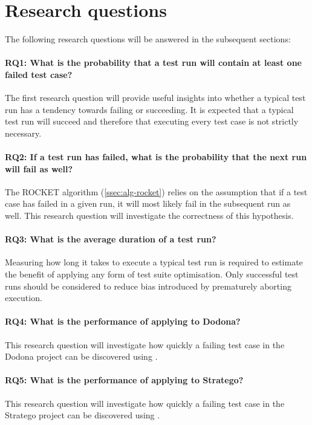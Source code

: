 
\section{Research questions}
The following research questions will be answered in the subsequent sections:

\paragraph*{RQ1: What is the probability that a test run will contain at least one failed test case?}
The first research question will provide useful insights into whether a typical test run has a tendency towards failing or succeeding. It is expected that a typical test run will succeed and therefore that executing every test case is not strictly necessary.

\paragraph*{RQ2: If a test run has failed, what is the probability that the next run will fail as well?}
The ROCKET algorithm (\autoref{ssec:alg-rocket}) relies on the assumption that if a test case has failed in a given run, it will most likely fail in the subsequent run as well. This research question will investigate the correctness of this hypothesis.

\paragraph*{RQ3: What is the average duration of a test run?}
Measuring how long it takes to execute a typical test run is required to estimate the benefit of applying any form of test suite optimisation. Only successful test runs should be considered to reduce bias introduced by prematurely aborting execution.

\paragraph*{RQ4: What is the performance of applying \tcp{} to Dodona?}
This research question will investigate how quickly a failing test case in the Dodona project can be discovered using \velocity{}.

\paragraph*{RQ5: What is the performance of applying \tcp{} to Stratego?}
This research question will investigate how quickly a failing test case in the Stratego project can be discovered using \velocity{}.